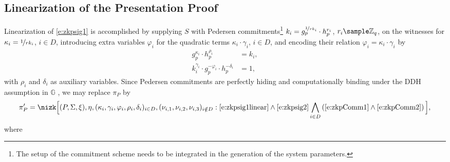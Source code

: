 \documentclass[runningheads]{llncs}
\newcommand{\Z}{\mathbb{Z}}
\begin{document}
\ifCRS

\else

\fi

\subsection{Linearization of the Presentation Proof}
\label{s:linearization}

Linearization of \eqref{e:zkpsig1} is accomplished by supplying $S$ 
with Pedersen commitments\footnote{The setup of the commitment scheme needs to be integrated in the generation of the system parameters.} $k_i= g_p^{\nicefrac{1}{rk_i}}\cdot h_p^{r_i}$, $r_i\sample\Z_q$, on the witnesses for $\kappa_i=\nicefrac{1}{rk_i}$, $i\in D$, introducing extra variables $\varphi_i$ for the quadratic terms $\kappa_i\cdot\gamma_i$, $i\in D$, and encoding their relation $\varphi_i=\kappa_i\cdot\gamma_i$ by
\begin{align}
\label{e:zkpComm1}
g_p^{\kappa_{i}}\cdot h_p^{\rho_{i}}  &= k_i,
\\
\label{e:zkpComm2}
k_i^{\gamma_{i}}\cdot g_p^{-\varphi_{i}}   \cdot h_p^{-\delta_{i}} &= 1,
\end{align}
with $\rho_i$ and $\delta_i$ as auxiliary variables.
Since Pedersen commitments are perfectly hiding and computationally binding under the DDH assumption in $\mathbb G$ , we may replace $\pi_P$ by
\begin{equation*}
\pi_P'= \nizk\Big[
(P, \Sigma, \xi), \eta, (\kappa_i, \gamma_{i}, \varphi_{i}, \rho_{i}, \delta_{i})_{i\in D}, (\nu_{i,1}, \nu_{i,2}, \nu_{i,3})_{i\notin D} : 
\\
\text{\eqref{e:zkpsig1linear}} \wedge
\text{\eqref{e:zkpsig2}} \bigwedge_{i\in D} \left(\text{\eqref{e:zkpComm1}}\wedge \text{\eqref{e:zkpComm2}}\right)
\Big],
\end{equation*}
where
\end{document}
